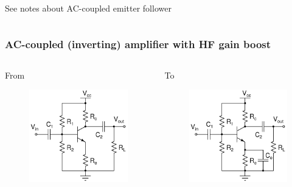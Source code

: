 \documentclass[beamer]{standalone}
\begin{document}
{\begin{columns}[c]
\begin{column}
		\pause
		See notes about AC-coupled emitter follower

	\end{column}
\end{columns}
	
	}

\begin{frame}
\frametitle{AC-coupled (inverting) amplifier with HF gain boost}
\begin{columns}[t]
	\begin{column}{.45\textwidth}
		From
		\begin{figure}
			\includegraphics[height=0.50\textheight]{./schematics/npn_ac_common_emitter_amplifier}
		\end{figure}
	\end{column}
	\begin{column}{.45\textwidth}
		To
		\begin{figure}
			\includegraphics[height=0.50\textheight]{./schematics/npn_ac_common_emitter_amplifier_with_ac_boost}

\end{figure}
\end{column}
\end{columns}
\end{frame}
\end{document}
